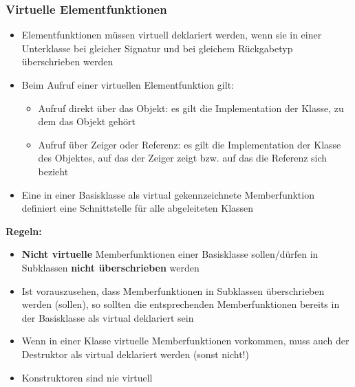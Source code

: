\subsubsection{Virtuelle Elementfunktionen}
\begin{itemize}
  \item Elementfunktionen müssen virtuell deklariert werden, wenn sie in einer Unterklasse bei gleicher Signatur und bei gleichem Rückgabetyp überschrieben werden
  \item Beim Aufruf einer virtuellen Elementfunktion gilt:
  \begin{itemize}
    \item Aufruf direkt über das Objekt: es gilt die Implementation der Klasse, zu dem das Objekt gehört
    \item Aufruf über Zeiger oder Referenz: es gilt die Implementation der Klasse des Objektes, auf das der Zeiger zeigt bzw. auf das die Referenz sich bezieht
  \end{itemize}
  \item Eine in einer Basisklasse als virtual gekennzeichnete Memberfunktion definiert eine Schnittstelle für alle abgeleiteten Klassen
\end{itemize}
\textbf{Regeln:}
\begin{itemize}
  \item \textbf{Nicht virtuelle} Memberfunktionen einer Basisklasse sollen/dürfen in Subklassen \textbf{nicht überschrieben} werden
  \item Ist vorauszusehen, dass Memberfunktionen in Subklassen überschrieben werden (sollen), so sollten die entsprechenden Memberfunktionen bereits in der Basisklasse als virtual deklariert sein
  \item Wenn in einer Klasse virtuelle Memberfunktionen vorkommen, muss auch der Destruktor als virtual deklariert werden (sonst nicht!)
  \item Konstruktoren sind nie virtuell
\end{itemize}

